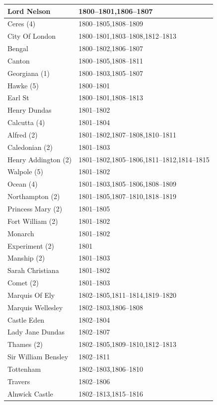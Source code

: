 \documentclass[CP]{copernicus}
\begin{document}
\begin{table}[!hbp]
\begin{minipage}[b]{0.5\linewidth}
{\begin{tabular}{|p{3.5cm}|p{3.5cm}|}
\hline
Lord Nelson & 1800--1801,1806--1807\\
\hline
Ceres (4) & 1800--1805,1808--1809\\
\hline
City Of London & 1800--1801,1803--1808,1812--1813\\
\hline
Bengal & 1800--1802,1806--1807\\
\hline
Canton & 1800--1805,1808--1811\\
\hline
Georgiana (1) & 1800--1803,1805--1807\\
\hline
Hawke (5) & 1800--1801\\
\hline
Earl St & 1800--1801,1808--1813\\
\hline
Henry Dundas & 1801--1802\\
\hline
Calcutta (4) & 1801--1804\\
\hline
Alfred (2) & 1801--1802,1807--1808,1810--1811\\
\hline
Caledonian (2) & 1801--1803\\
\hline
Henry Addington (2) & 1801--1802,1805--1806,1811--1812,1814--1815\\
\hline
Walpole (5) & 1801--1802\\
\hline
Ocean (4) & 1801--1803,1805--1806,1808--1809\\
\hline
Northampton (2) & 1801--1805,1807--1810,1818--1819\\
\hline
Princess Mary (2) & 1801--1805\\
\hline
Fort William (2) & 1801--1802\\
\hline
Monarch & 1801--1802\\
\hline
Experiment (2) & 1801\\
\hline
Manship (2) & 1801--1803\\
\hline
Sarah Christiana & 1801--1802\\
\hline
Comet (2) & 1801--1803\\
\hline
Marquis Of Ely & 1802--1805,1811--1814,1819--1820\\
\hline
Marquis Wellesley & 1802--1803,1806--1808\\
\hline
Castle Eden & 1802--1804\\
\hline
Lady Jane Dundas & 1802--1807\\
\hline
Thames (2) & 1802--1805,1809--1810,1812--1813\\
\hline
Sir William Bensley & 1802--1811\\
\hline
Tottenham & 1802--1803,1806--1810\\
\hline
Travers & 1802--1806\\
\hline
Alnwick Castle & 1802--1813,1815--1816\\

\end{tabular}}
\end{minipage}
\end{table}
\end{document}
